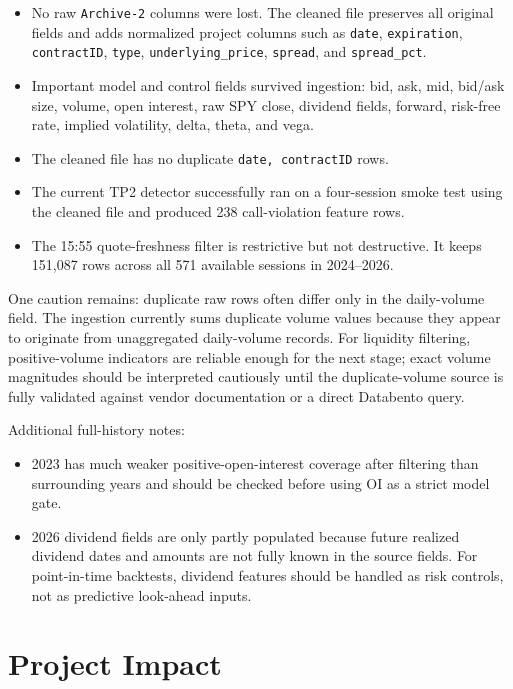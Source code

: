 \documentclass[11pt]{article}
\begin{document}
\begin{itemize}
  \item No raw \texttt{Archive-2} columns were lost. The cleaned file preserves all
  original fields and adds normalized project columns such as \texttt{date},
  \texttt{expiration}, \texttt{contractID}, \texttt{type},
  \texttt{underlying\_price}, \texttt{spread}, and \texttt{spread\_pct}.
  \item Important model and control fields survived ingestion: bid, ask, mid,
  bid/ask size, volume, open interest, raw SPY close, dividend fields, forward,
  risk-free rate, implied volatility, delta, theta, and vega.
  \item The cleaned file has no duplicate \texttt{date, contractID} rows.
  \item The current TP2 detector successfully ran on a four-session smoke test
  using the cleaned file and produced 238 call-violation feature rows.
  \item The 15:55 quote-freshness filter is restrictive but not destructive. It
  keeps 151,087 rows across all 571 available sessions in 2024--2026.
\end{itemize}

One caution remains: duplicate raw rows often differ only in the daily-volume
field. The ingestion currently sums duplicate volume values because they appear
to originate from unaggregated daily-volume records. For liquidity filtering,
positive-volume indicators are reliable enough for the next stage; exact volume
magnitudes should be interpreted cautiously until the duplicate-volume source is
fully validated against vendor documentation or a direct Databento query.

Additional full-history notes:

\begin{itemize}
  \item 2023 has much weaker positive-open-interest coverage after filtering
  than surrounding years and should be checked before using OI as a strict model
  gate.
  \item 2026 dividend fields are only partly populated because future realized
  dividend dates and amounts are not fully known in the source fields. For
  point-in-time backtests, dividend features should be handled as risk controls,
  not as predictive look-ahead inputs.
\end{itemize}

\section*{Project Impact}
\end{document}
